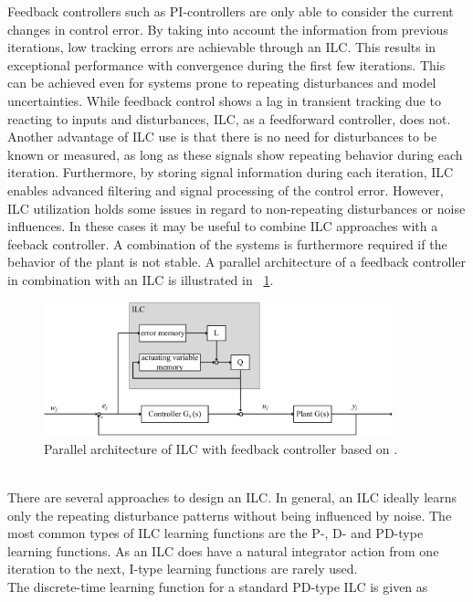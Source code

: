  Feedback controllers such as PI-controllers are only able to consider the current changes in control error. By taking into account the information from previous iterations, low tracking errors are achievable through an ILC. This results in exceptional performance with convergence during the first few iterations. This can be achieved even for systems prone to repeating disturbances and model uncertainties. While feedback control shows a lag in transient tracking due to reacting to inputs and disturbances, ILC, as a feedforward controller, does not. Another advantage of ILC use is that there is no need for disturbances to be known or measured, as long as these signals show repeating behavior during each iteration. Furthermore, by storing signal information during each iteration, ILC enables advanced filtering and signal processing of the control error. However, ILC utilization holds some issues in regard to non-repeating disturbances or noise influences. In these cases it may be useful to combine ILC approaches with a feeback controller. A combination of the systems is furthermore required if the behavior of the plant is not stable. \cite{ILC2} A parallel architecture of a feedback controller in combination with an ILC is illustrated in \figurename~\ref{fig:ILC_parallel}.
 \begin{figure}[h]
    \centering
    \includegraphics[width=0.9\textwidth]{images/chapt_3/ILC_parallel.pdf}
    \caption[Parallel architecture of ILC with feedback controller]{Parallel architecture of ILC with feedback controller based on \cite{ILC2}.}
    \label{fig:ILC_parallel}
  \end{figure}
\\There are several approaches to design an ILC. In general, an ILC ideally learns only the repeating disturbance patterns without being influenced by noise. The most common types of ILC learning functions are the P-, D- and PD-type learning functions. As an ILC does have a natural integrator action from one iteration to the next, I-type learning functions are rarely used.
\\The discrete-time learning function for a standard PD-type ILC is given as 
